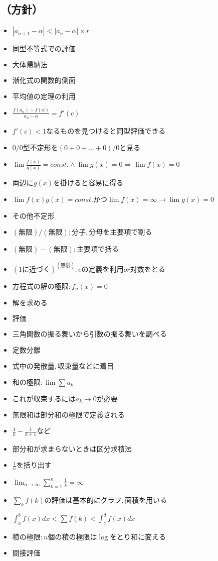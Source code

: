 \documentclass[dvipdfmx,uplatex]{jsarticle}
\begin{document}
\subsection{（方針）}
\begin{itemize}
	\item $ |a_{n+1} - α| < |a_{n} - α| \times r$
		\item $ 同型不等式での評価$
		\item $ 大体帰納法$
	\item $ 漸化式の関数的側面$
		\item $ 平均値の定理の利用$
			\item $ \frac{f(a_n) - f(α)}{a_n - α} = f'(c)$
			\item $ f'(c) < 1なるものを見つけると同型評価できる$
	\item $ 0/0型不定形を(0+0+...+0)/0と見る$
	\item $ \lim \frac{f(x)}{g(x)} = const. ∧ \lim g(x) = 0 ⇒ \lim f(x) = 0$
		\item $ 両辺にg(x)を掛けると容易に得る$
	\item $ \lim f(x)g(x) = const. かつ \lim f(x) = \infty \rightarrow \lim g(x) = 0$
	\item $ その他不定形$
		\item $ (無限)/(無限): 分子,分母を主要項で割る$
		\item $ (無限)-(無限): 主要項で括る$
		\item $ {(1に近づく)}^{(無限)}: eの定義を利用or対数をとる$
	\item $ 方程式の解の極限: f_n(x) = 0$
		\item $ 解を求める$
			\item $ 評価$
			\item $ 三角関数の振る舞いから引数の振る舞いを調べる$
		\item $ 定数分離$
		\item $ 式中の発散量,収束量などに着目$
	\item $ 和の極限: \lim \sum a_k$
		\item $ これが収束するには a_k \to 0 が必要$
		\item $ 無限和は部分和の極限で定義される$
			\item $ \frac{1}{k} - \frac{1}{k+1} など$
		\item $ 部分和が求まらないときは区分求積法$
			\item $ \frac{1}{n}を括り出す$
			\item $ \lim_{n \to \infty} \sum^n_{k = 1} \frac{1}{k} = \infty$
		\item $ \sum_k f(k) の評価は基本的にグラフ,面積を用いる$
			\item $ \int^b_a f(x)dx < \sum f(k) < \int^d_c f(x)dx$
	\item $ 積の極限: n個の積の極限は \log をとり和に変える$
		\item $ 間接評価$
\end{itemize}
\end{document}
